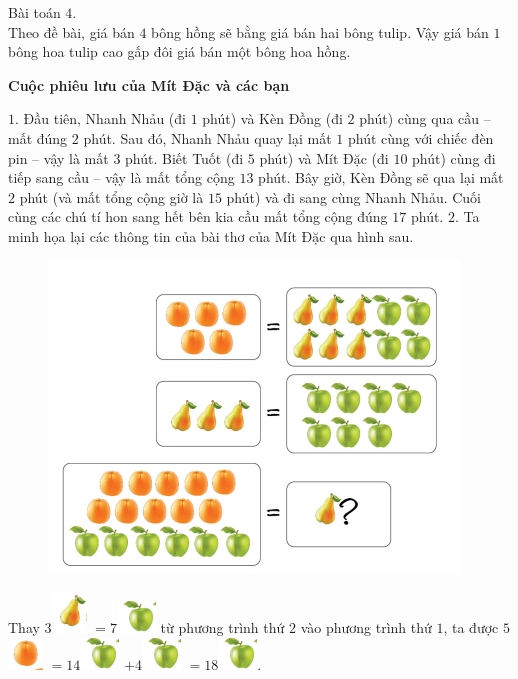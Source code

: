 Bài toán $4.$\\
Theo đề bài, giá bán $4$ bông hồng sẽ bằng giá bán hai bông tulip. Vậy giá bán $1$ bông hoa tulip cao gấp đôi giá bán một bông hoa hồng.
\begin{center}
	\textbf{\color{toancuabi}Cuộc phiêu lưu của Mít Đặc và các bạn}
\end{center}
$1.$ Đầu tiên, Nhanh Nhảu (đi $1$ phút) và Kèn Đồng (đi $2$ phút) cùng qua cầu -- mất đúng $2$ phút. Sau đó, Nhanh Nhảu quay lại mất $1$ phút cùng với chiếc đèn pin -- vậy là mất $3$ phút. Biết Tuốt (đi $5$ phút) và Mít Đặc (đi $10$ phút) cùng đi tiếp sang cầu -- vậy là mất tổng cộng $13$ phút. Bây giờ, Kèn Đồng sẽ qua lại mất $2$ phút (và mất tổng cộng giờ là $15$ phút) và đi sang cùng Nhanh Nhảu. Cuối cùng các chú tí hon sang hết bên kia cầu mất tổng cộng đúng $17$ phút.
\vskip 0.1cm
$2.$ Ta minh họa lại các thông tin của bài thơ của Mít Đặc qua hình sau.
\begin{figure}[H]
	\centering
	\vspace*{-5pt}
	\captionsetup{labelformat= empty, justification=centering}
	\includegraphics[width=0.5\linewidth]{3}
	\vspace*{-15pt}
\end{figure}
Thay $3$\includegraphics{4}  $= 7$\includegraphics{5} từ phương trình thứ $2$ vào phương trình thứ $1$, ta được
\vskip 0.1cm
$5$\includegraphics{6}  $= 14$\includegraphics{5}  $+ 4$\includegraphics{5}  $= 18$\includegraphics{5}.
